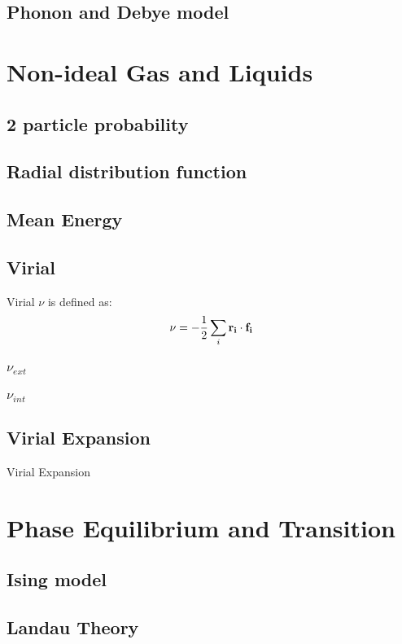 \documentclass[12pt,a4paper]{article}
\begin{document}
\subsection{Phonon and Debye model}
\section{Non-ideal Gas and Liquids}
\subsection{2 particle probability}
\subsection{Radial distribution function}

\subsection{Mean Energy}
\subsection{Virial}
Virial $\nu$ is defined as: 
\begin{align*}
    \nu = -\dfrac{1}{2} \sum_i {\vb{r_i}\cdot \vb{f_i}}
\end{align*}
\subsubsection{${\nu_{ext}}$}
\subsubsection{${\nu_{int}}$}
\subsection{Virial Expansion}
Virial Expansion

\section{Phase Equilibrium and Transition}
\subsection{Ising model}

\subsection{Landau Theory}
\end{document}
